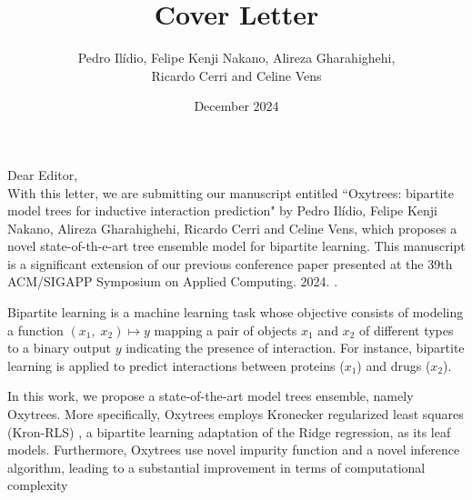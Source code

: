 \documentclass{article}
\title{Cover Letter}
\author{Pedro Ilídio, Felipe Kenji Nakano, Alireza Gharahighehi, \\ Ricardo Cerri and Celine Vens}
\date{December 2024}
\begin{document}
%
\maketitle



Dear Editor,
~\\

With this letter, we are submitting our manuscript entitled ``Oxytrees: bipartite model trees for inductive interaction prediction" by Pedro Ilídio, Felipe Kenji Nakano, Alireza Gharahighehi, Ricardo Cerri and Celine Vens, which proposes a novel state-of-th-e-art tree ensemble model for bipartite learning. 
This manuscript is a significant extension of our previous conference paper presented at the 39th ACM/SIGAPP Symposium on Applied Computing. 2024. \cite{ilidio_fast_2024}. 


Bipartite learning is a machine learning task whose objective consists of modeling a function $(x_1,\; x_2) \mapsto y$ mapping a pair of objects $x_1$ and $x_2$ of different types to a binary output $y$ indicating the presence of interaction. For instance, bipartite learning is applied to predict interactions between proteins ($x_1$) and drugs ($x_2$).

In this work, we propose a state-of-the-art model trees ensemble, namely Oxytrees. More specifically, Oxytrees employs Kronecker regularized least squares (Kron-RLS) \cite{van_laarhoven_gaussian_2011}, a bipartite learning adaptation of the Ridge regression, as its leaf models. Furthermore, Oxytrees use novel impurity function and a novel inference algorithm, leading to a substantial improvement in terms of computational complexity
\end{document}
